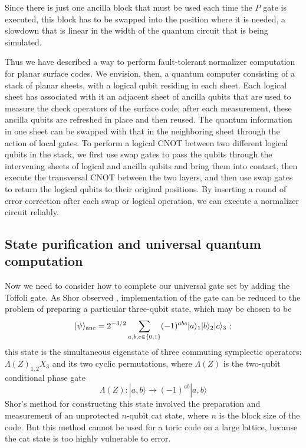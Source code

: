 Since there is just one ancilla block that must be used each time the $P$ gate is executed, this block has to be swapped into the position where it is needed, a slowdown that is linear in the width of the quantum circuit that is being simulated.


Thus we have described a way to perform fault-tolerant normalizer computation for planar surface codes. We envision, then, a quantum computer consisting of a stack of planar sheets, with a logical qubit residing in each sheet. Each logical sheet has associated with it an adjacent sheet of ancilla qubits that are used to measure the check operators of the surface code; after each measurement, these ancilla qubits are refreshed in place and then reused. The quantum information in one sheet can be swapped with that in the neighboring sheet through the action of local gates. To perform a logical CNOT between two different logical qubits in the stack, we  first use swap gates to pass the qubits through the intervening sheets of logical and ancilla qubits and bring them into contact, then execute the transversal CNOT between the two layers, and then use swap gates to return the logical qubits to their original positions. By inserting a round of error correction after each swap or logical operation, we can execute a normalizer circuit reliably.



\subsection{State purification and universal quantum computation}

Now we need to consider how to complete our universal gate set by adding the Toffoli gate. As Shor observed \cite{shor_ft}, implementation of the gate can be reduced to the problem of preparing a particular three-qubit state, which may be chosen to be
\begin{equation}
|\psi\rangle_{\rm anc}=2^{-3/2}\sum_{a,b,c\in\{0,1\}} (-1)^{abc}|a\rangle_1|b\rangle_2|c\rangle_3~;
\end{equation}
this state is the simultaneous eigenstate of three commuting symplectic operators: 
$\Lambda(Z)_{1,2}X_3$ and its two cyclic permutations, where $\Lambda(Z)$ is the two-qubit conditional phase gate
\begin{equation}
\Lambda(Z): |a,b\rangle \to (-1)^{ab}|a,b\rangle
\end{equation}
Shor's method for constructing this state involved the preparation and measurement of an unprotected $n$-qubit cat state, where $n$ is the block size of the code. But this method cannot be used for a toric code on a large lattice, because the cat state is too highly vulnerable to error.

